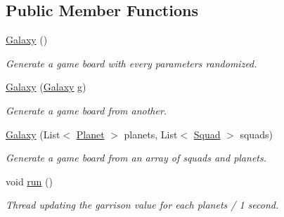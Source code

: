 \subsection*{Public Member Functions}
\begin{DoxyCompactItemize}
\item 
\mbox{\label{classfr_1_1groupe40_1_1projet_1_1model_1_1board_1_1_galaxy_acd002a00e4679b804002c05afb3b8308}} 
\mbox{\hyperlink{classfr_1_1groupe40_1_1projet_1_1model_1_1board_1_1_galaxy_acd002a00e4679b804002c05afb3b8308}{Galaxy}} ()
\begin{DoxyCompactList}\small\item\em Generate a game board with every parameters randomized. \end{DoxyCompactList}\item 
\mbox{\hyperlink{classfr_1_1groupe40_1_1projet_1_1model_1_1board_1_1_galaxy_ae10e23d6a41a5b878123a8b03ec31e5a}{Galaxy}} (\mbox{\hyperlink{classfr_1_1groupe40_1_1projet_1_1model_1_1board_1_1_galaxy}{Galaxy}} g)
\begin{DoxyCompactList}\small\item\em Generate a game board from another. \end{DoxyCompactList}\item 
\mbox{\hyperlink{classfr_1_1groupe40_1_1projet_1_1model_1_1board_1_1_galaxy_ab214654e58ccf7bc40216d177cde0479}{Galaxy}} (List$<$ \mbox{\hyperlink{classfr_1_1groupe40_1_1projet_1_1model_1_1planets_1_1_planet}{Planet}} $>$ planets, List$<$ \mbox{\hyperlink{classfr_1_1groupe40_1_1projet_1_1model_1_1ships_1_1_squad}{Squad}} $>$ squads)
\begin{DoxyCompactList}\small\item\em Generate a game board from an array of squads and planets. \end{DoxyCompactList}\item 
\mbox{\label{classfr_1_1groupe40_1_1projet_1_1model_1_1board_1_1_galaxy_a272bf97a6e0b4381bacb6fd2f0d8bb05}} 
void \mbox{\hyperlink{classfr_1_1groupe40_1_1projet_1_1model_1_1board_1_1_galaxy_a272bf97a6e0b4381bacb6fd2f0d8bb05}{run}} ()
\begin{DoxyCompactList}\small\item\em Thread updating the garrison value for each planets / 1 second. \end{DoxyCompactList}\item 

\end{DoxyCompactItemize}

